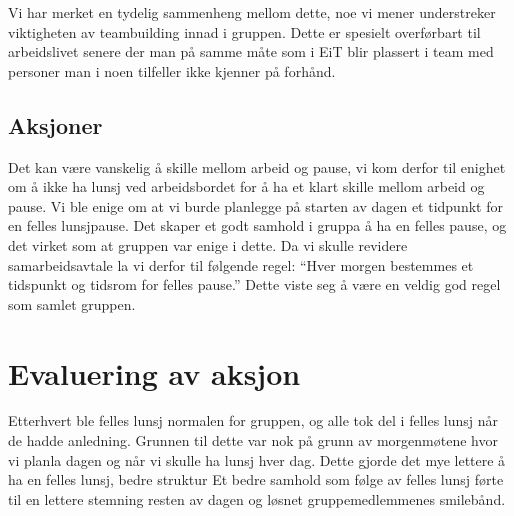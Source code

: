 Vi har merket en tydelig sammenheng mellom dette, noe vi mener understreker viktigheten av teambuilding innad i gruppen. Dette er spesielt overførbart til arbeidslivet senere der man på samme måte som i EiT blir plassert i team med personer man i noen tilfeller ikke kjenner på forhånd.

\subsection*{Aksjoner}
Det kan være vanskelig å skille mellom arbeid og pause, vi kom derfor til enighet om å ikke ha lunsj ved arbeidsbordet for å ha et klart skille mellom arbeid og pause. 
Vi ble enige om at vi burde planlegge på starten av dagen et tidpunkt for en felles lunsjpause. Det skaper et godt samhold i gruppa å ha en felles pause, og det virket som at gruppen var enige i dette.  Da vi skulle revidere samarbeidsavtale la vi derfor til følgende regel:  ``Hver morgen bestemmes et tidspunkt og tidsrom for felles pause.'' Dette viste seg å være en veldig god regel som samlet gruppen.

\section{Evaluering av aksjon} 
Etterhvert ble felles lunsj normalen for gruppen, og alle tok del i felles lunsj når de hadde anledning. Grunnen til dette var nok på grunn av morgenmøtene hvor vi planla dagen og når vi skulle ha lunsj hver dag. Dette gjorde det mye lettere å ha en felles lunsj, bedre struktur Et bedre samhold som følge av felles lunsj førte til en lettere stemning resten av dagen og løsnet gruppemedlemmenes smilebånd.